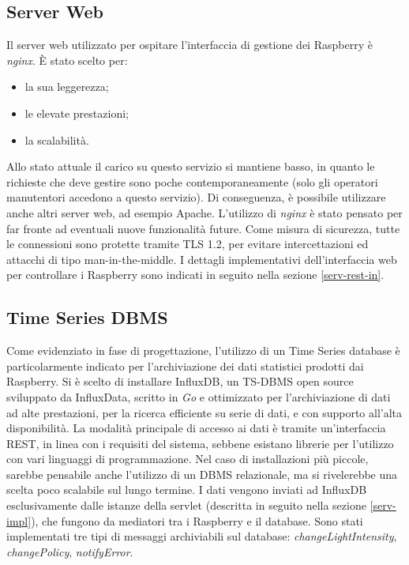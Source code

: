 \subsection{Server Web}
Il server web utilizzato per ospitare l'interfaccia di gestione dei Raspberry è \textit{nginx}. È stato scelto per:
\begin{itemize}
 \item la sua leggerezza;
 \item le elevate prestazioni;
 \item la scalabilità.
\end{itemize}
Allo stato attuale il carico su questo servizio si mantiene basso, in quanto le richieste che deve gestire sono poche contemporaneamente (solo gli operatori manutentori accedono a questo servizio).
Di conseguenza, è possibile utilizzare anche altri server web, ad esempio Apache. L'utilizzo di \textit{nginx} è stato pensato per far fronte ad eventuali nuove funzionalità future.
Come misura di sicurezza, tutte le connessioni sono protette tramite TLS 1.2, per evitare intercettazioni ed attacchi di tipo man-in-the-middle.
I dettagli implementativi dell'interfaccia web per controllare i Raspberry sono indicati in seguito nella sezione \ref{serv-rest-in}.

\subsection{Time Series DBMS \label{tsdbms}}
Come evidenziato in fase di progettazione, l'utilizzo di un Time Series database è particolarmente indicato per l'archiviazione dei dati statistici prodotti dai Raspberry.
Si è scelto di installare InfluxDB, un TS-DBMS open source sviluppato da InfluxData, scritto in \textit{Go} e ottimizzato per l'archiviazione di dati ad alte prestazioni, per la ricerca efficiente su serie di dati, e con supporto all'alta disponibilità.
La modalità principale di accesso ai dati è tramite un'interfaccia REST, in linea con i requisiti del sistema, sebbene esistano librerie per l'utilizzo con vari linguaggi di programmazione.
Nel caso di installazioni più piccole, sarebbe pensabile anche l'utilizzo di un DBMS relazionale, ma si rivelerebbe una scelta poco scalabile sul lungo termine.
I dati vengono inviati ad InfluxDB esclusivamente dalle istanze della servlet (descritta in seguito nella sezione \ref{serv-impl}), che fungono da mediatori tra i Raspberry e il database.
Sono stati implementati tre tipi di messaggi archiviabili sul database: \textit{changeLightIntensity}, \textit{changePolicy}, \textit{notifyError}.
